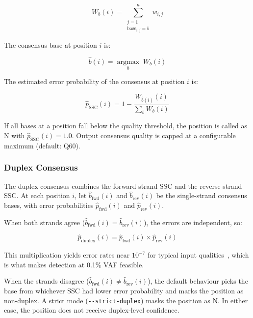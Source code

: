 \begin{equation}
  \label{eq:weight-sum}
  W_b(i) = \sum_{\substack{j=1 \\ \text{base}_{i,j} = b}}^{n} w_{i,j}
\end{equation}

The consensus base at position $i$ is:

\begin{equation}
  \label{eq:consensus-base}
  \hat{b}(i) = \operatorname*{argmax}_{b} \; W_b(i)
\end{equation}

The estimated error probability of the consensus at position $i$ is:

\begin{equation}
  \label{eq:consensus-error}
  \hat{p}_\text{SSC}(i) = 1 - \frac{W_{\hat{b}(i)}(i)}{\sum_{b} W_b(i)}
\end{equation}

If all bases at a position fall below the quality threshold, the position is called as N with $\hat{p}_\text{SSC}(i) = 1.0$.
Output consensus quality is capped at a configurable maximum (default: Q60).

\subsubsection{Duplex Consensus}
\label{sec:method:duplex}

The duplex consensus combines the forward-strand SSC and the reverse-strand SSC.
At each position $i$, let $\hat{b}_\text{fwd}(i)$ and $\hat{b}_\text{rev}(i)$ be the single-strand consensus bases, with error probabilities $\hat{p}_\text{fwd}(i)$ and $\hat{p}_\text{rev}(i)$.

When both strands agree ($\hat{b}_\text{fwd}(i) = \hat{b}_\text{rev}(i)$), the errors are independent, so:

\begin{equation}
  \label{eq:duplex-error}
  \hat{p}_\text{duplex}(i) = \hat{p}_\text{fwd}(i) \times \hat{p}_\text{rev}(i)
\end{equation}

This multiplication yields error rates near $10^{-7}$ for typical input qualities~\autocite{Schmitt12duplex}, which is what makes detection at 0.1\% VAF feasible.

When the strands disagree ($\hat{b}_\text{fwd}(i) \neq \hat{b}_\text{rev}(i)$), the default behaviour picks the base from whichever SSC had lower error probability and marks the position as non-duplex.
A strict mode (\texttt{-{}-strict-duplex}) masks the position as N.
In either case, the position does not receive duplex-level confidence.

